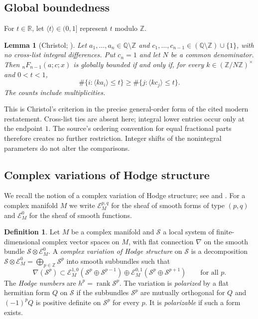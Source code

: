 \documentclass[11pt]{amsart}
\newtheorem{lemma}[theorem]{Lemma}
\theoremstyle{definition}
\newtheorem{definition}[theorem]{Definition}
\theoremstyle{remark}
\numberwithin{equation}{section}
\newcommand{\Q}{\mathbb{Q}}
\newcommand{\Z}{\mathbb{Z}}
\newcommand{\R}{\mathbb{R}}
\newcommand{\cS}{\mathcal{S}}
\newcommand{\cE}{\mathcal{E}}
\DeclareMathOperator{\rank}{rank}
\begin{document}
\subsection{Global boundedness}
For $t\in\R$, let $\langle t\rangle\in(0,1]$ represent $t$ modulo $\Z$.
\begin{lemma}[{Christol; \citep[Theorem~2.3]{FurnsinnYurkevich2024}}]\label{lem:christol}
Let $a_1,\dots,a_n\in\Q\setminus\Z$ and $c_1,\dots,c_{n-1}\in(\Q\setminus\Z)\cup\{1\}$, with no cross-list integral differences. Put $c_n=1$ and let $N$ be a common denominator. Then ${}_nF_{n-1}(a;c;x)$ is globally bounded if and only if, for every $k\in(\Z/N\Z)^\times$ and $0<t<1$,
\[
\#\{i:\langle ka_i\rangle\le t\}\ge\#\{j:\langle kc_j\rangle\le t\}.
\]
The counts include multiplicities.
\end{lemma}
This is Christol's criterion \citep{Christol1987} in the precise general-order form of the cited modern restatement. Cross-list ties are absent here; integral lower entries occur only at the endpoint $1$. The source's ordering convention for equal fractional parts therefore creates no further restriction. Integer shifts of the nonintegral parameters do not alter the comparisons.



\subsection{Complex variations of Hodge structure}
We recall the notion of a complex variation of Hodge structure; see \citet[\S1]{Deligne1987} and \citet{Simpson1988}. For a complex manifold $M$ we write $\cE^{p,q}_M$ for the sheaf of smooth forms of type $(p,q)$ and $\cE^0_M$ for the sheaf of smooth functions.

\begin{definition}\label{def:cvhs}
Let $M$ be a complex manifold and $\cS$ a local system of finite-dimensional complex vector spaces on $M$, with flat connection $\nabla$ on the smooth bundle $\cS\otimes\cE^0_M$. A \emph{complex variation of Hodge structure} on $\cS$ is a decomposition $\cS\otimes\cE^0_M=\bigoplus_{p\in\Z}\cS^p$ into smooth subbundles such that
\begin{equation}\label{eq:griffiths}
\nabla(\cS^p)\subset\cE^{1,0}_M(\cS^p\oplus\cS^{p-1})\oplus\cE^{0,1}_M(\cS^p\oplus\cS^{p+1})\qquad\text{for all }p .
\end{equation}
The \emph{Hodge numbers} are $h^p=\rank\cS^p$. The variation is \emph{polarized} by a flat hermitian form $Q$ on $\cS$ if the subbundles $\cS^p$ are mutually orthogonal for $Q$ and $(-1)^pQ$ is positive definite on $\cS^p$ for every $p$. It is \emph{polarizable} if such a form exists.
\end{definition}
\end{document}
